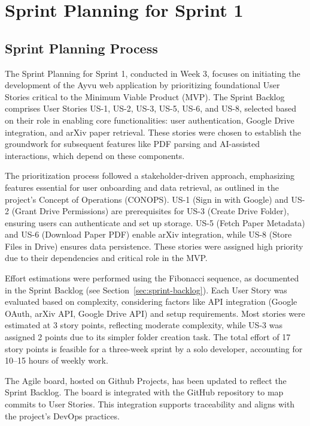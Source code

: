 \documentclass[12pt]{article}
\begin{document}
\section{Sprint Planning for Sprint 1}

\subsection{Sprint Planning Process}
The Sprint Planning for Sprint 1, conducted in Week 3, focuses on initiating the development of the Ayvu web application by prioritizing foundational User Stories critical to the Minimum Viable Product (MVP). The Sprint Backlog comprises User Stories US-1, US-2, US-3, US-5, US-6, and US-8, selected based on their role in enabling core functionalities: user authentication, Google Drive integration, and arXiv paper retrieval. These stories were chosen to establish the groundwork for subsequent features like PDF parsing and AI-assisted interactions, which depend on these components.

The prioritization process followed a stakeholder-driven approach, emphasizing features essential for user onboarding and data retrieval, as outlined in the project's Concept of Operations (CONOPS). US-1 (Sign in with Google) and US-2 (Grant Drive Permissions) are prerequisites for US-3 (Create Drive Folder), ensuring users can authenticate and set up storage. US-5 (Fetch Paper Metadata) and US-6 (Download Paper PDF) enable arXiv integration, while US-8 (Store Files in Drive) ensures data persistence. These stories were assigned high priority due to their dependencies and critical role in the MVP.

Effort estimations were performed using the Fibonacci sequence, as documented in the Sprint Backlog (see Section~\ref{sec:sprint-backlog}). Each User Story was evaluated based on complexity, considering factors like API integration (Google OAuth, arXiv API, Google Drive API) and setup requirements. Most stories were estimated at 3 story points, reflecting moderate complexity, while US-3 was assigned 2 points due to its simpler folder creation task. The total effort of 17 story points is feasible for a three-week sprint by a solo developer, accounting for 10–15 hours of weekly work.

The Agile board, hosted on Github Projects, has been updated to reflect the Sprint Backlog. The board is integrated with the GitHub repository to map commits to User Stories. This integration supports traceability and aligns with the project's DevOps practices.
\end{document}
